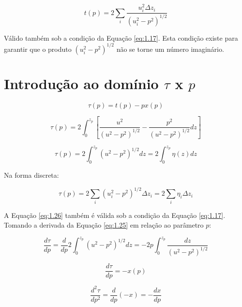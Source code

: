 \documentclass[a4paper, 12pt]{article}
\begin{document}
\begin{equation}
 \label{eq:1.22}
 t(p)=2\sum_i \frac{u^2_i\Delta z_i}{(u^2_i-p^2)^{1/2}}
\end{equation}

Válido também sob a condição da Equação \ref{eq:1.17}. Esta condição existe para garantir que o produto $(u^2_i-p^2)^{1/2}$
não se torne um número imaginário.

\section{Introdução ao domínio $\tau$ x $p$}

\begin{equation}
 \label{eq:1.23}
 \tau(p) = t(p)-px(p)
\end{equation}

\begin{equation}
 \label{eq:1.24}
 \tau(p) = 2\int^{z_p}_{0}\left[ \frac{u^2}{(u^2-p^2)^{1/2}} - \frac{p^2}{(u^2-p^2)^{1/2}} dz \right]
\end{equation}

\begin{equation}
 \label{eq:1.25}
 \tau(p) = 2\int^{z_p}_{0} (u^2-p^2)^{1/2} dz = 2\int^{z_p}_{0}\eta(z)dz
\end{equation}

Na forma discreta:

\begin{equation}
 \label{eq:1.26}
 \tau(p) = 2\sum_{i}(u^2_i-p^2)^{1/2} \Delta z_i = 2\sum_i \eta_i \Delta z_i
\end{equation}

A Equação \ref{eq:1.26} também é válida sob a condição da Equação \ref{eq:1.17}. Tomando a derivada da 
Equação \ref{eq:1.25} em relação ao parâmetro $p$:

\begin{equation}
 \label{eq:1.27}
 \frac{d\tau}{dp} = \frac{d}{dp}2\int^{z_p}_{0} (u^2-p^2)^{1/2} dz = -2p\int^{z_p}_{0}\frac{dz}{(u^2-p^2)^{1/2}}
\end{equation}

\begin{equation}
 \label{eq:1.28}
 \frac{d\tau}{dp} = -x(p)
\end{equation}

\begin{equation}
 \label{eq:1.29}
 \frac{d^2\tau}{dp^2} = \frac{d}{dp}(-x) = -\frac{dx}{dp}
\end{equation}
\end{document}
